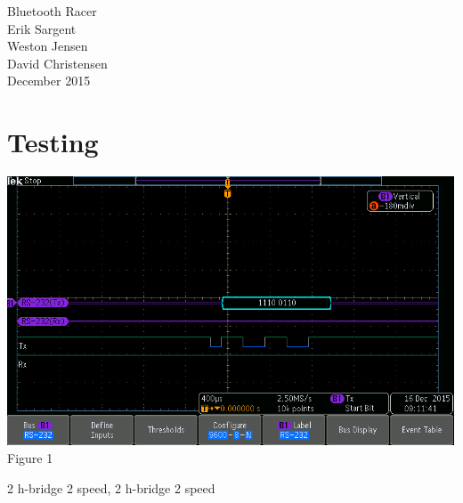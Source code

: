 \documentclass[12pt]{article}
\begin{document}
\begin{titlepage}
\begin {center}
\Huge Bluetooth Racer\\


\Large Erik Sargent\\
\Large Weston Jensen\\
\Large David Christensen\\
December 2015\\
\end {center}

\end{titlepage}


\tableofcontents
\newpage

\section{Testing}


\begin {center}
\includegraphics[scale=.75]{uart-message}
\\
Figure 1
\end {center}
2 h-bridge 2 speed, 2 h-bridge 2 speed
\end{document}
